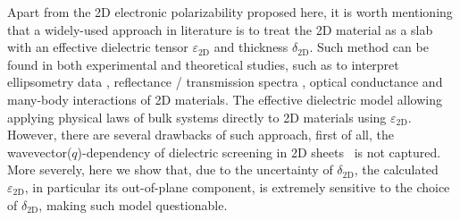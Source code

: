 \documentclass[journal=ancac3,manuscript=article,email=true,hyperref=true,keywords=false]{achemso}
\begin{document}
Apart from the 2D electronic polarizability proposed here, it is worth
mentioning that a widely-used approach in literature is to treat the
2D material as a slab with an effective dielectric tensor
$\varepsilon_{\mathrm{2D}}$ and thickness $\delta_{\mathrm{2D}}$. Such
method can be found in both experimental and theoretical studies, such
as to interpret ellipsometry data
\cite{graphene-epsilon10,Duesberg14,Chiang13,Kong14}, reflectance /
transmission spectra \cite{Li_2014, Yoffe-Wilson69}, optical
conductance \cite{Matthes_2016} and many-body interactions
\cite{Sohier_2016,Meckbach_2018} of 2D materials. The effective
dielectric model allowing applying physical laws of bulk systems
directly to 2D materials using $\varepsilon_{\mathrm{2D}}$. However,
there are several drawbacks of such approach, first of all, the
wavevector($q$)-dependency of dielectric screening in 2D
sheets~\cite{Cudazzo_2011_screening_2D,Olsen_2016_hydrogen,Trolle_2017_eps_subst}
is not captured. More severely, here we show that, due to the
uncertainty of $\delta_{\mathrm{2D}}$, the calculated
$\varepsilon_{\mathrm{2D}}$, in particular its out-of-plane component,
is extremely sensitive to the choice of $\delta_{\mathrm{2D}}$, making
such model questionable.
\end{document}
